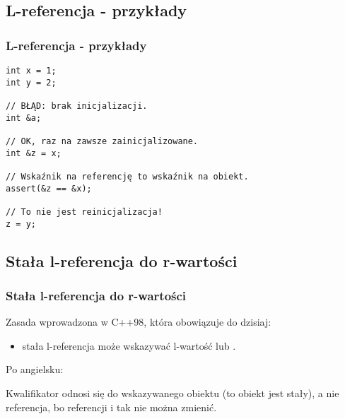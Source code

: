 \documentclass[compress]{beamer}
\begin{document}

\subsection{L-referencja - przykłady}

\begin{frame}[fragile]

  \frametitle{L-referencja - przykłady}

\begin{lstlisting}
int x = 1;
int y = 2;

// BŁĄD: brak inicjalizacji.
int &a;

// OK, raz na zawsze zainicjalizowane.
int &z = x;

// Wskaźnik na referencję to wskaźnik na obiekt.
assert(&z == &x);

// To nie jest reinicjalizacja!
z = y;
\end{lstlisting}
  
\end{frame}


\subsection{Stała l-referencja do r-wartości}

\begin{frame}

  \frametitle{Stała l-referencja do r-wartości}


  \vspace{0.5cm}

  Zasada wprowadzona w C++98, która obowiązuje do dzisiaj:
  \begin{itemize}
  \item stała l-referencja może wskazywać l-wartość lub .
  \end{itemize}

  \vspace{0.5cm}

  Po angielsku: 

  \vspace{0.5cm}

  Kwalifikator  odnosi się do wskazywanego obiektu (to
  obiekt jest stały), a nie referencja, bo referencji i tak nie można
  zmienić.

\end{frame}
\end{document}
